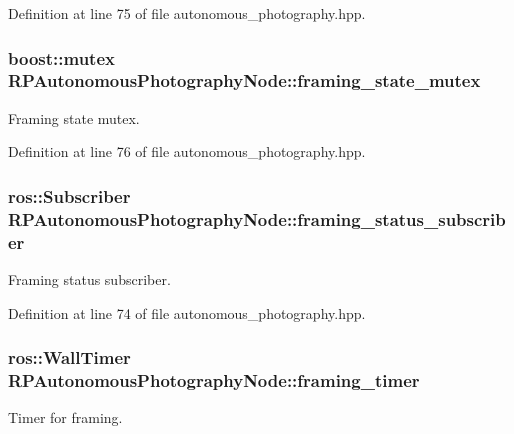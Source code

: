 \-Definition at line 75 of file autonomous\-\_\-photography.\-hpp.

\hypertarget{class_r_p_autonomous_photography_node_a52a7a8c95eff1f589091f679f3d57492}{
\subsubsection[{framing\-\_\-state\-\_\-mutex}]{\setlength{\rightskip}{0pt plus 5cm}boost\-::mutex {\bf \-R\-P\-Autonomous\-Photography\-Node\-::framing\-\_\-state\-\_\-mutex}}}\label{class_r_p_autonomous_photography_node_a52a7a8c95eff1f589091f679f3d57492}
\-Framing state mutex. 

\-Definition at line 76 of file autonomous\-\_\-photography.\-hpp.

\hypertarget{class_r_p_autonomous_photography_node_a2a2bdd2d12fafa13bcb66b8f37279bcd}{
\subsubsection[{framing\-\_\-status\-\_\-subscriber}]{\setlength{\rightskip}{0pt plus 5cm}ros\-::\-Subscriber {\bf \-R\-P\-Autonomous\-Photography\-Node\-::framing\-\_\-status\-\_\-subscriber}}}\label{class_r_p_autonomous_photography_node_a2a2bdd2d12fafa13bcb66b8f37279bcd}
\-Framing status subscriber. 

\-Definition at line 74 of file autonomous\-\_\-photography.\-hpp.

\hypertarget{class_r_p_autonomous_photography_node_a91e869e881e77d50e9664fdc21809ed7}{
\subsubsection[{framing\-\_\-timer}]{\setlength{\rightskip}{0pt plus 5cm}ros\-::\-Wall\-Timer {\bf \-R\-P\-Autonomous\-Photography\-Node\-::framing\-\_\-timer}}}\label{class_r_p_autonomous_photography_node_a91e869e881e77d50e9664fdc21809ed7}
\-Timer for framing. 

